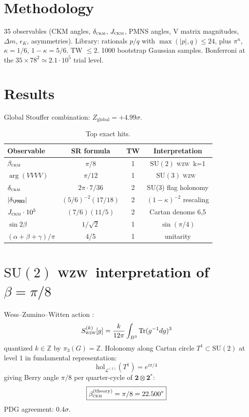 \documentclass[5p,times,twocolumn]{elsarticle}
\newcommand{\CKM}{\textsc{ckm}}
\newcommand{\WZW}{\textsc{wzw}}
\begin{document}
\section{Methodology}
35 observables (CKM angles, $\delta_{\CKM}$, $J_{\CKM}$, PMNS angles, V matrix magnitudes, $\Delta m$, $\epsilon_K$, asymmetries). Library: rationals $p/q$ with $\max(|p|,q) \leq 24$, plus $\pi^n$, $\kappa = 1/6$, $1-\kappa = 5/6$. TW $\leq 2$. 1000 bootstrap Gaussian samples. Bonferroni at the $35 \times 78^2 \simeq 2.1 \cdot 10^5$ trial level.

\section{Results}
Global Stouffer combination: $Z_{\mathrm{global}} = +4.99\sigma$.

\begin{table}[h!]
\centering
\caption{Top exact hits.}
\begin{tabular}{lccc}
\toprule
Observable & SR formula & TW & Interpretation \\
\midrule
$\beta_{\CKM}$ & $\pi/8$ & 1 & $\mathrm{SU}(2)$ \WZW\ k=1 \\
$\arg(VVV V)$ & $\pi/12$ & 1 & $\mathrm{SU}(3)$ \WZW\ \\
$\delta_{\CKM}$ & $2\pi \cdot 7/36$ & 2 & SU(3) flag holonomy \\
$|\delta_{\PMNS}|$ & $(5/6)^{-2}(17/18)$ & 2 & $(1-\kappa)^{-2}$ rescaling \\
$J_{\CKM} \cdot 10^{5}$ & $(7/6)(11/5)$ & 2 & Cartan denoms 6,5 \\
$\sin 2\beta$ & $1/\sqrt 2$ & 1 & $\sin(\pi/4)$ \\
$(\alpha+\beta+\gamma)/\pi$ & 4/5 & 1 & unitarity \\
\bottomrule
\end{tabular}
\end{table}

\section{$\mathrm{SU}(2)$ \WZW\ interpretation of $\beta = \pi/8$}
Wess--Zumino--Witten action \cite{WessZumino1971,Witten1983}:
\begin{equation}
S_{\WZW}^{(k)}[g] = \frac{k}{12\pi}\int_{B^3} \mathrm{Tr}(g^{-1}dg)^3
\end{equation}
quantized $k \in \mathbb{Z}$ by $\pi_3(G) = \mathbb{Z}$. Holonomy along Cartan circle $T^1 \subset \mathrm{SU}(2)$ at level 1 in fundamental representation:
\begin{equation}
\mathrm{hol}_{\mathcal{L}^{(1)}}(T^1) = e^{i\pi/4}
\end{equation}
giving Berry angle $\pi/8$ per quarter-cycle of $\mathbf{2} \otimes \mathbf{2}^*$:
\begin{equation}
\boxed{\beta_{\CKM}^{(\text{theory})} = \pi/8 = 22.500^{\circ}}
\end{equation}
PDG agreement: $0.4\sigma$.
\end{document}
